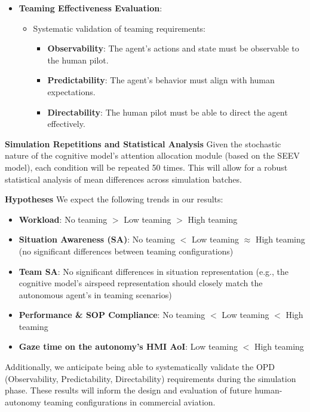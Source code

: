 \documentclass[12pt,a4paper]{article} %
\begin{document}
\begin{itemize}
\begin{itemize}
	\end{itemize}
	\item \textbf{Teaming Effectiveness Evaluation}:
	\begin{itemize}
	\item Systematic validation of teaming requirements:
	\begin{itemize}
	\item \textbf{Observability}: The agent’s actions and state must be observable to the human pilot.
	\item \textbf{Predictability}: The agent’s behavior must align with human expectations.
	\item \textbf{Directability}: The human pilot must be able to direct the agent effectively.
	\end{itemize}
	\end{itemize}
	\end{itemize}
	
	\textbf{Simulation Repetitions and Statistical Analysis}
	Given the stochastic nature of the cognitive model’s attention allocation module (based on the SEEV model), each condition will be repeated 50 times. This will allow for a robust statistical analysis of mean differences across simulation batches.
	
	\textbf{Hypotheses}
	We expect the following trends in our results:
	\begin{itemize}
	\item \textbf{Workload}: No teaming $>$ Low teaming $>$ High teaming
	\item \textbf{Situation Awareness (SA)}: No teaming $<$ Low teaming $\approx$ High teaming (no significant differences between teaming configurations)
	\item \textbf{Team SA}: No significant differences in situation representation (e.g., the cognitive model's airspeed representation should closely match the autonomous agent's in teaming scenarios)
	\item \textbf{Performance \& SOP Compliance}: No teaming $<$ Low teaming $<$ High teaming
	\item \textbf{Gaze time on the autonomy's HMI AoI}: Low teaming $<$ High teaming
	\end{itemize}
	Additionally, we anticipate being able to systematically validate the OPD (Observability, Predictability, Directability) requirements during the simulation phase. These results will inform the design and evaluation of future human-autonomy teaming configurations in commercial aviation.
	
\end{document}
